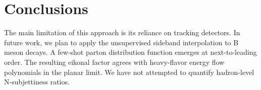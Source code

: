 \section{Conclusions}\label{sec:conclusions}

The main limitation of this approach is its reliance on tracking
detectors. In future work, we plan to apply the unsupervised sideband
interpolation to B meson decays. A few-shot parton distribution function
emerges at next-to-leading order. The resulting eikonal factor agrees
with heavy-flavor energy flow polynomials in the planar limit. We have
not attempted to quantify hadron-level N-subjettiness ratios.

